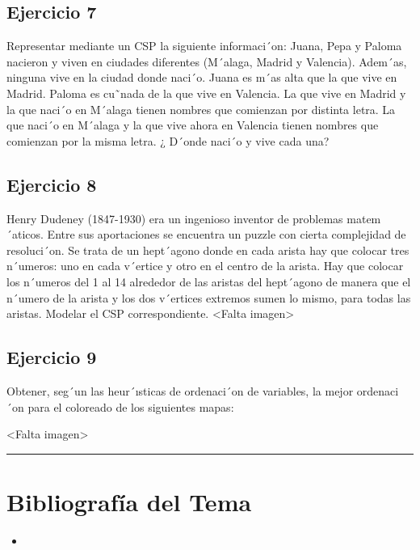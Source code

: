 \subsection{Ejercicio 7} Representar mediante un CSP la siguiente informaci´on: Juana, Pepa y Paloma nacieron
y viven en ciudades diferentes (M´alaga, Madrid y Valencia). Adem´as, ninguna vive en
la ciudad donde naci´o. Juana es m´as alta que la que vive en Madrid. Paloma es cu˜nada
de la que vive en Valencia. La que vive en Madrid y la que naci´o en M´alaga tienen
nombres que comienzan por distinta letra. La que naci´o en M´alaga y la que vive ahora
en Valencia tienen nombres que comienzan por la misma letra.
\medskip
¿ D´onde naci´o y vive cada una?

\subsection{Ejercicio 8} Henry Dudeney (1847-1930) era un ingenioso inventor de problemas matem´aticos. Entre sus aportaciones se encuentra un puzzle con cierta complejidad de resoluci´on. Se
trata de un hept´agono donde en cada arista hay que colocar tres n´umeros: uno en cada
v´ertice y otro en el centro de la arista. Hay que colocar los n´umeros del 1 al 14 alrededor
de las aristas del hept´agono de manera que el n´umero de la arista y los dos v´ertices
extremos sumen lo mismo, para todas las aristas. Modelar el CSP correspondiente.
<Falta imagen>

\subsection{Ejercicio 9} Obtener, seg´un las heur´ısticas de ordenaci´on de variables, la mejor ordenaci´on para el
coloreado de los siguientes mapas:


<Falta imagen>


\bigskip
\noindent\rule{\textwidth}{0.4pt} 

\section*{Bibliografía del Tema}

\begin{itemize}
    \item
\end{itemize}
\newpage